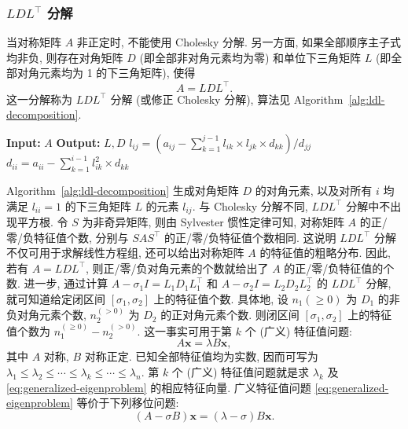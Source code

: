 \subsubsection{{$LDL^\top$ 分解}}\label{subsec:ldl-decomposition}
{当对称矩阵 $A$ 非正定时, 不能使用 Cholesky 分解. 另一方面, 如果全部顺序主子式均非负, 则存在对角矩阵 $D$ (即全部非对角元素均为零) 和单位下三角矩阵 $L$ (即全部对角元素均为 1 的下三角矩阵), 使得}
\[A=LDL^\top.\]
{这一分解称为 $LDL^\top$ 分解 (或修正 Cholesky 分解), 算法见 Algorithm~\ref{alg:ldl-decomposition}.}
\begin{algorithm}[H]
\caption{{$LDL^\top$ 分解}}\label{alg:ldl-decomposition}
\begin{algorithmic}[1]
\Statex\textbf{Input:} $A$
\Statex\textbf{Output:} $L,D$
\State $l_{ij}=(a_{ij}-\sum_{k=1}^{j-1}l_{ik}\times l_{jk}\times d_{kk})/d_{jj}$
\EndFor
\State $d_{ii}=a_{ii}-\sum_{k=1}^{i-1}l_{ik}^2\times d_{kk}$
\EndFor
\end{algorithmic}
\end{algorithm}
{Algorithm~\ref{alg:ldl-decomposition} 生成对角矩阵 $D$ 的对角元素, 以及对所有 $i$ 均满足 $l_{ii}=1$ 的下三角矩阵 $L$ 的元素 $l_{ij}$. 与 Cholesky 分解不同, $LDL^\top$ 分解中不出现平方根.}
{令 $S$ 为非奇异矩阵, 则由 Sylvester 惯性定律可知, 对称矩阵 $A$ 的正/零/负特征值个数, 分别与 $SAS^\top$ 的正/零/负特征值个数相同. 这说明 $LDL^\top$ 分解不仅可用于求解线性方程组, 还可以给出对称矩阵 $A$ 的特征值的粗略分布. 因此, 若有 $A=LDL^\top$, 则正/零/负对角元素的个数就给出了 $A$ 的正/零/负特征值的个数.}
{进一步, 通过计算 $A-\sigma_1 I=L_1D_1L_1^\top$ 和 $A-\sigma_2 I=L_2D_2L_2^\top$ 的 $LDL^\top$ 分解, 就可知道给定闭区间 $[\sigma_1,\sigma_2]$ 上的特征值个数. 具体地, 设 $n_1(\ge0)$ 为 $D_1$ 的非负对角元素个数, $n_2^{(>0)}$ 为 $D_2$ 的正对角元素个数. 则闭区间 $[\sigma_1,\sigma_2]$ 上的特征值个数为 $n_1^{(\ge0)}-n_2^{(>0)}$.}
{这一事实可用于第 $k$ 个 (广义) 特征值问题:}
\begin{equation}\label{eq:generalized-eigenproblem}A\bm x=\lambda B\bm x,\end{equation}
{其中 $A$ 对称, $B$ 对称正定. 已知全部特征值均为实数, 因而可写为 $\lambda_1\le\lambda_2\le\cdots\le\lambda_k\le\cdots\le\lambda_n$. 第 $k$ 个 (广义) 特征值问题就是求 $\lambda_k$ 及 \eqref{eq:generalized-eigenproblem} 的相应特征向量. 广义特征值问题 \eqref{eq:generalized-eigenproblem} 等价于下列移位问题:}
\begin{equation}\label{eq:shifted-generalized-eigenproblem}(A-\sigma B)\bm x=(\lambda-\sigma)B\bm x.\end{equation}
